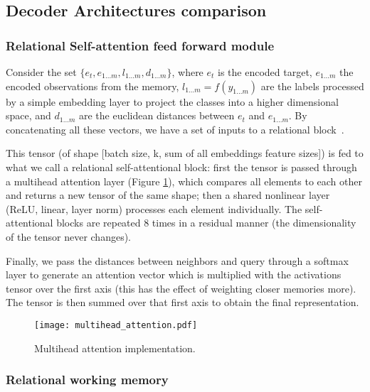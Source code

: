 \documentclass{article} \usepackage{iclr2019_conference,times}
\begin{document}
\subsection{Decoder Architectures comparison}
\label{sec:dec_arch}

\subsubsection{Relational Self-attention feed forward module}

Consider the set $\{e_t, e_{1...m}, l_{1...m}, d_{1...m}\}$, where $e_t$ is the encoded target, $e_{1...m}$ the encoded observations from the memory, $l_{1...m} = f(y_{1...m})$ are the labels processed by a simple embedding layer to project the classes into a higher dimensional space, and $d_{1...m}$ are the euclidean distances between $e_t$ and $e_{1...m}$. By concatenating all these vectors, we have a set of inputs to a relational block~\citep{battaglia2018relational}.

This tensor (of shape [batch size, k, sum of all embeddings feature sizes]) is fed to what we call a relational self-attentional block: first the tensor is passed through a multihead attention layer (Figure \ref{fig:ma_att}), which compares all elements to each other and returns a new tensor of the same shape; then a shared nonlinear layer (ReLU, linear, layer norm) processes each element individually. The self-attentional blocks are repeated 8 times in a residual manner (the dimensionality of the tensor never changes). 

Finally, we pass the distances between neighbors and query through a softmax layer to generate an attention vector which is multiplied with the activations tensor over the first axis (this has the effect of weighting closer memories more). The tensor is then summed over that first axis to obtain the final representation.

\begin{figure}[ht]
\begin{center}
\texttt{[image: multihead\_attention.pdf]}
\end{center}
\caption{Multihead attention implementation.}
\label{fig:ma_att}
\end{figure}

\subsubsection{Relational working memory}
\end{document}
